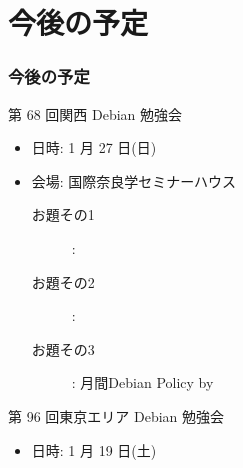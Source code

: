 \documentclass[cjk,dvipdfmx,10pt,compress,%
hyperref={bookmarks=true,bookmarksnumbered=true,bookmarksopen=false,%
colorlinks=false,%
pdftitle={第 67 回 関西 Debian 勉強会},%
pdfauthor={倉敷・のがた・佐々木・かわだ},%
pdfsubject={資料},%
}]{beamer}
\begin{document}
\section{今後の予定}
\begin{frame}[fragile]
\frametitle{今後の予定}

\begin{block}{第 68 回関西 Debian 勉強会}
\begin{itemize}
  \item 日時: 1 月 27 日(日)
  \item 会場: 国際奈良学セミナーハウス
    \begin{description}
    \item[お題その1]:
    \item[お題その2]:
    \item[お題その3]: 月間Debian Policy by
    \end{description}
\end{itemize}
\end{block}

\begin{block}{第 96 回東京エリア Debian 勉強会}
  \begin{itemize}
  \item 日時: 1 月 19 日(土)
  \end{itemize}
\end{block}

\end{frame}


\takahashi[50]{  }
\end{document}
